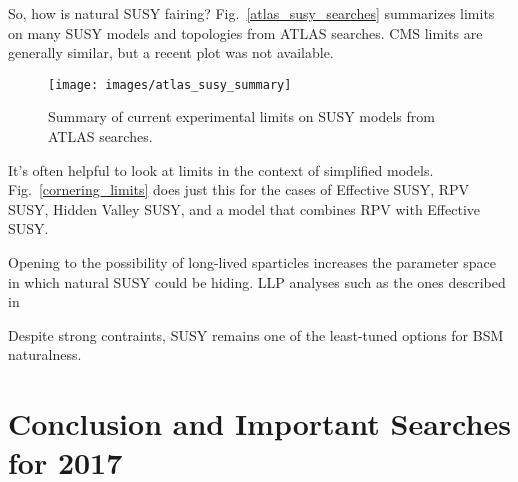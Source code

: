 \documentclass[12pt]{article}
\begin{document}
    So, how is natural SUSY fairing? Fig.~\ref{atlas_susy_searches} summarizes limits on many SUSY models and topologies from ATLAS searches. CMS limits are generally similar, but a recent plot was not available.  

    \noindent \begin{figure}[htbp] \begin{center}
    \texttt{[image: images/atlas\_susy\_summary]}
    \caption{Summary of current experimental limits on SUSY models from ATLAS searches.}
    \label{atlas_susy_summary}
    \end{center} \end{figure}

    It's often helpful to look at limits in the context of simplified models. Fig.~\ref{cornering_limits} does just this for the cases of Effective SUSY, RPV SUSY, Hidden Valley SUSY, and a model that combines RPV with Effective SUSY. 

    Opening to the possibility of long-lived sparticles increases the parameter space in which natural SUSY could be hiding. LLP analyses such as the ones described in    

    Despite strong contraints, SUSY remains one of the least-tuned options for BSM naturalness.

\section{Conclusion and Important Searches for 2017}


\clearpage
\pagebreak
\singlespacing
{}

\end{document}
